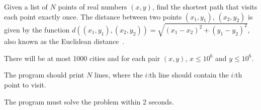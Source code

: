 Given a list of $N$ points of real numbers $(x,y)$, find the shortest path that
visits each point exactly once. The distance between two points $(x_1, y_1)$,
$(x_2, y_2)$ is given by the function 
$d((x_1, y_1),(x_2, y_2)) = \sqrt{(x_1 - x_2)^2 + (y_1 - y_2)^2}$,
also known as the Euclidean distance~\cite{wikipedia:euclidean_distance}.

There will be at most 1000 cities and for each pair $(x, y)$, $x \leq 10^6$ and 
$y \leq 10^6$.

The program should print $N$ lines, where the $i$:th line should contain 
the $i$:th point to visit.

The program must solve the problem within 2 seconds.

